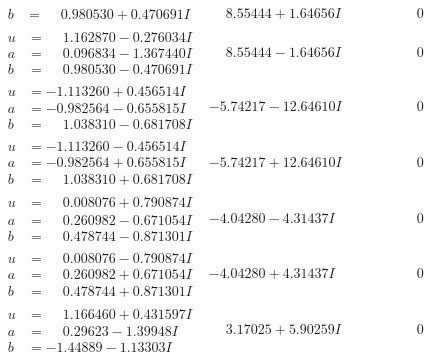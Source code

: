\documentclass[1p]{elsarticle_modified}
\theoremstyle{definition}
\begin{document}
$$\begin{array}{c|c|c}
\begin{aligned}
b &= \phantom{-}0.980530 + 0.470691 I\end{aligned}
 & \phantom{-}8.55444 + 1.64656 I & \phantom{-0.000000 } 0 \\ \hline\begin{aligned}
u &= \phantom{-}1.162870 - 0.276034 I \\
a &= \phantom{-}0.096834 - 1.367440 I \\
b &= \phantom{-}0.980530 - 0.470691 I\end{aligned}
 & \phantom{-}8.55444 - 1.64656 I & \phantom{-0.000000 } 0 \\ \hline\begin{aligned}
u &= -1.113260 + 0.456514 I \\
a &= -0.982564 - 0.655815 I \\
b &= \phantom{-}1.038310 - 0.681708 I\end{aligned}
 & -5.74217 - 12.64610 I & \phantom{-0.000000 } 0 \\ \hline\begin{aligned}
u &= -1.113260 - 0.456514 I \\
a &= -0.982564 + 0.655815 I \\
b &= \phantom{-}1.038310 + 0.681708 I\end{aligned}
 & -5.74217 + 12.64610 I & \phantom{-0.000000 } 0 \\ \hline\begin{aligned}
u &= \phantom{-}0.008076 + 0.790874 I \\
a &= \phantom{-}0.260982 - 0.671054 I \\
b &= \phantom{-}0.478744 - 0.871301 I\end{aligned}
 & -4.04280 - 4.31437 I & \phantom{-0.000000 } 0 \\ \hline\begin{aligned}
u &= \phantom{-}0.008076 - 0.790874 I \\
a &= \phantom{-}0.260982 + 0.671054 I \\
b &= \phantom{-}0.478744 + 0.871301 I\end{aligned}
 & -4.04280 + 4.31437 I & \phantom{-0.000000 } 0 \\ \hline\begin{aligned}
u &= \phantom{-}1.166460 + 0.431597 I \\
a &= \phantom{-}0.29623 - 1.39948 I \\
b &= -1.44889 - 1.13303 I\end{aligned}
 & \phantom{-}3.17025 + 5.90259 I & \phantom{-0.000000 } 0 \\ \hline\begin{aligned}

\end{aligned}
\end{array}$$
\end{document}
